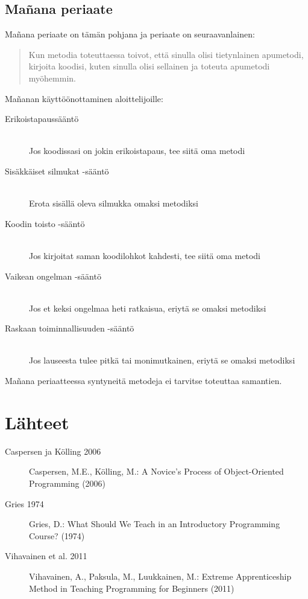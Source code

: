 \documentclass{tktltiki}
\begin{document}
\subsection{Mañana periaate}

Mañana periaate on tämän pohjana ja periaate on seuraavanlainen:

\begin{quotation}
Kun metodia toteuttaessa toivot, että sinulla olisi tietynlainen apumetodi, kirjoita koodisi, kuten sinulla olisi sellainen ja toteuta apumetodi myöhemmin.
\end{quotation}

Mañanan käyttöönottaminen aloittelijoille:

\begin{description}
  \item[Erikoistapaussääntö] \hfill \\
  Jos koodissasi on jokin erikoistapaus, tee siitä oma metodi
  \item[Sisäkkäiset silmukat -sääntö] \hfill \\
  Erota sisällä oleva silmukka omaksi metodiksi
  \item[Koodin toisto -sääntö] \hfill \\
  Jos kirjoitat saman koodilohkot kahdesti, tee siitä oma metodi
  \item[Vaikean ongelman -sääntö] \hfill \\
  Jos et keksi ongelmaa heti ratkaisua, eriytä se omaksi metodiksi
  \item[Raskaan toiminnallisuuden -sääntö] \hfill \\
  Jos lauseesta tulee pitkä tai monimutkainen, eriytä se omaksi metodiksi
\end{description}

Mañana periaatteessa syntyneitä metodeja ei tarvitse toteuttaa samantien.


\newpage

\section{Lähteet}

\begin{description}
  \item [Caspersen ja Kölling 2006] Caspersen, M.E., Kölling, M.: A Novice's Process of Object-Oriented Programming (2006)
  \item [Gries 1974] Gries, D.: What Should We Teach in an Introductory Programming Course? (1974)
  \item [Vihavainen et al. 2011] Vihavainen, A., Paksula, M., Luukkainen, M.: Extreme Apprenticeship Method in Teaching Programming for Beginners (2011)
\end{description}



\lastpage
\end{document}
